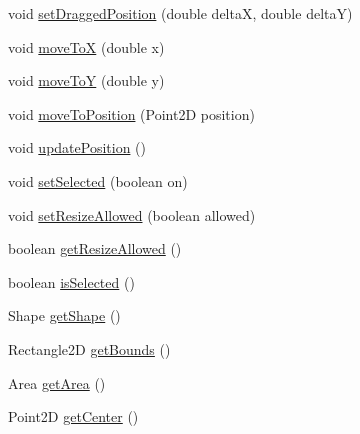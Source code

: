 \begin{DoxyCompactItemize}
\item 
void \hyperlink{classorg_1_1tzi_1_1use_1_1gui_1_1views_1_1diagrams_1_1elements_1_1_placeable_node_a84016146f75792eca0660b784e5378bc}{set\-Dragged\-Position} (double delta\-X, double delta\-Y)
\item 
void \hyperlink{classorg_1_1tzi_1_1use_1_1gui_1_1views_1_1diagrams_1_1elements_1_1_placeable_node_a3bc639a782e5aa7570ecdb40ca09b77c}{move\-To\-X} (double x)
\item 
void \hyperlink{classorg_1_1tzi_1_1use_1_1gui_1_1views_1_1diagrams_1_1elements_1_1_placeable_node_aee395c21b92c6ef5a1501001a0217799}{move\-To\-Y} (double y)
\item 
void \hyperlink{classorg_1_1tzi_1_1use_1_1gui_1_1views_1_1diagrams_1_1elements_1_1_placeable_node_a9d3483652f5912c8561200fefe5092fe}{move\-To\-Position} (Point2\-D position)
\item 
void \hyperlink{classorg_1_1tzi_1_1use_1_1gui_1_1views_1_1diagrams_1_1elements_1_1_placeable_node_af440d304fb67c3638946e3a5d8cb1f78}{update\-Position} ()
\item 
void \hyperlink{classorg_1_1tzi_1_1use_1_1gui_1_1views_1_1diagrams_1_1elements_1_1_placeable_node_a9d8dbd890ac796ee2b84e1a3017b4c12}{set\-Selected} (boolean on)
\item 
void \hyperlink{classorg_1_1tzi_1_1use_1_1gui_1_1views_1_1diagrams_1_1elements_1_1_placeable_node_ae9e916b627b77da3304ff27ab61beaab}{set\-Resize\-Allowed} (boolean allowed)
\item 
boolean \hyperlink{classorg_1_1tzi_1_1use_1_1gui_1_1views_1_1diagrams_1_1elements_1_1_placeable_node_adc1a74b9f273738197acf07b632cd2bf}{get\-Resize\-Allowed} ()
\item 
boolean \hyperlink{classorg_1_1tzi_1_1use_1_1gui_1_1views_1_1diagrams_1_1elements_1_1_placeable_node_a0ce0d3f20bd5f1e0f036214b1fd88558}{is\-Selected} ()
\item 
Shape \hyperlink{classorg_1_1tzi_1_1use_1_1gui_1_1views_1_1diagrams_1_1elements_1_1_placeable_node_a393bd3e4ba0622cfad3129f1def9cb39}{get\-Shape} ()
\item 
Rectangle2\-D \hyperlink{classorg_1_1tzi_1_1use_1_1gui_1_1views_1_1diagrams_1_1elements_1_1_placeable_node_a59a6e22a72f525ba410218c26fe91ef9}{get\-Bounds} ()
\item 
Area \hyperlink{classorg_1_1tzi_1_1use_1_1gui_1_1views_1_1diagrams_1_1elements_1_1_placeable_node_a8bee63b7d174b3b86b36cc56671bd386}{get\-Area} ()
\item 
Point2\-D \hyperlink{classorg_1_1tzi_1_1use_1_1gui_1_1views_1_1diagrams_1_1elements_1_1_placeable_node_af626872134e7a15ddaa421fa6256fe91}{get\-Center} ()

\end{DoxyCompactItemize}
